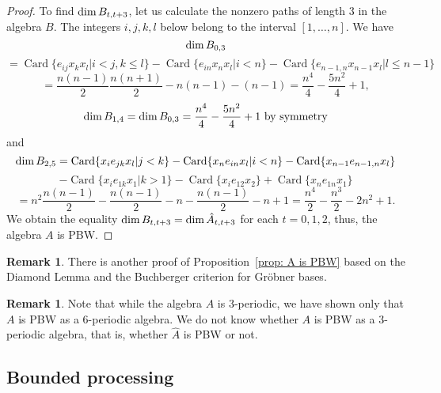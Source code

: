 \documentclass{amsart}
\numberwithin{equation}{section}
\theoremstyle{plain}
\theoremstyle{definition}
\newtheorem{rema}[theorem]{Remark}
\begin{document}
\begin{proof}
To find ${\mbox{dim\,}} B_{t, t+3}$, let us calculate the nonzero paths of
length 3 in the algebra $B$. The integers $i,j,k,l$ below  belong to the interval $[1,\dots,n]$.  We have
$$
{\mbox{dim\,}} B_{0, 3} $$
$$
= {\mathop{\mathrm{Card}}} \{ e_{ij}x_k x_l|i<j, k\le l\} - {\mathop{\mathrm{Card}}}
\{ e_{in}x_n x_l|i<n \} -{\mathop{\mathrm{Card}}}  \{ e_{n-1,n}x_{n-1} x_l|l \le
n-1\} $$
$$= \frac{n(n-1)}{2}\frac{n(n+1)}{2} - n(n-1)-(n-1) =
\frac{n^4}{4} -\frac{5n^2}{4}+1,
$$
$$
{\mbox{dim\,}} B_{1, 4} = {\mbox{dim\,}} B_{0, 3} = \frac{n^4}{4} -\frac{5n^2}{4}+1
\mbox{ by symmetry}
$$
and
$$
{\mbox{dim\,}} B_{2, 5} = {\mathop{\mathrm{Card}}} \{ x_i e_{jk} x_l |j<k \}
 - {\mathop{\mathrm{Card}}} \{ x_n e_{in} x_l|i<n \}
 -  {\mathop{\mathrm{Card}}} \{ x_{n-1} e_{n-1,n} x_l \}
 $$
 $$
  - {\mathop{\mathrm{Card}}} \{ x_i e_{1k} x_1|k>1\} -  {\mathop{\mathrm{Card}}} \{ x_i e_{12} x_2 \}
 +{\mathop{\mathrm{Card}}} \{ x_n e_{1n} x_1 \} $$
 $$=
 n^2\frac{n(n-1)}{2} - \frac{n(n-1)}{2} - n
 - \frac{n(n-1)}{2} - n +1 = \frac{n^4}2 -\frac{n^3}2-2n^2+1.
$$
We obtain the equality  ${\mbox{dim\,}}  B_{t, t+3} = {\mbox{dim\,}} \hat
A_{t,t+3}$ for each $t=0,1,2$, thus,  the algebra $A$ is PBW.
\end{proof}

\begin{rema}
There is another proof of Proposition~\ref{prop: A is PBW} based on the 
  Diamond Lemma and the Buchberger criterion for
Gr\"obner bases.
\end{rema}

\begin{rema}
Note that while the algebra $A$ is 3-periodic, we have shown only 
that $A$ is PBW as a 6-periodic algebra. We do not know whether  $A$
is  PBW as a 3-periodic algebra, that is, whether $\hat A$ is PBW or not.
\end{rema}

\subsection{Bounded processing}

\label{subs:proc}
\end{document}
